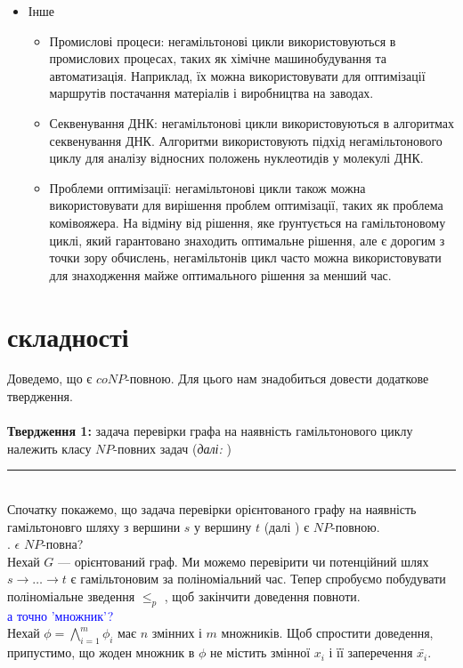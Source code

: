 \documentclass[14pt]{article}
\begin{document}
\begin{spacing}{1.175}
\begin{itemize}
\begin{itemize}
        \end{itemize}


        \item Інше
        \begin{itemize}
            
            \item Промислові процеси: негамільтонові цикли використовуються в промислових процесах, таких як хімічне машинобудування та автоматизація. Наприклад, їх можна використовувати для оптимізації маршрутів постачання матеріалів і виробництва на заводах.

            \item Секвенування ДНК: негамільтонові цикли використовуються в алгоритмах секвенування ДНК. Алгоритми використовують підхід негамільтонового циклу для аналізу відносних положень нуклеотидів у молекулі ДНК.

            \item Проблеми оптимізації: негамільтонові цикли також можна використовувати для вирішення проблем оптимізації, таких як проблема комівояжера. На відміну від рішення, яке ґрунтується на гамільтоновому циклі, який гарантовано знаходить оптимальне рішення, але є дорогим з точки зору обчислень, негамільтонів цикл часто можна використовувати для знаходження майже оптимального рішення за менший час.
        
        \end{itemize}
    \end{itemize}
    

    
    
    \section{ складності}
    \quad Доведемо, що \nonhamcycle є \(coNP\)-повною. Для цього нам знадобиться довести додаткове твердження. \\\\
    \textbf{Твердження 1:} задача перевірки графа на наявність гамільтонового циклу належить класу \(NP\)-повних задач (\textit{далі:} \hamcycle)\\
    \rule{0.7em}{0.7em}\\
    Спочатку покажемо, що задача перевірки орієнтованого графу на наявність гамільтоновго шляху з вершини \(s\) у вершину \(t\) (далі \dhampath)  є \(NP\)-повною.
    \\ 
    
    . \dhampath \(\epsilon\) \(NP\)-повна?\\
    Нехай \(G\) — орієнтований граф. Ми можемо перевірити чи потенційний шлях \(s \to \dots \to t\) є гамільтоновим за поліноміальний час. Тепер спробуємо побудувати поліноміальне зведення \tsat \(\le_p\) \dhampath, щоб закінчити доведення повноти.
    \\
    \textcolor{blue}{а точно 'множник'?}\\
    Нехай \(\phi = \bigwedge_{i=1}^{m} \phi_{i}\) має \(n\) змінних і \(m\) множників. Щоб спростити доведення, припустимо, що жоден множник в \(\phi\) не містить змінної \(x_i\) і її заперечення \(\bar{x_i}\).  
    

\end{spacing}
\end{document}
